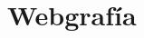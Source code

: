 \section{Webgrafía} 
\textbf{}\\
\begin{flushleft}

\begin{itemize}

	

\end{itemize} 


\end{flushleft}
